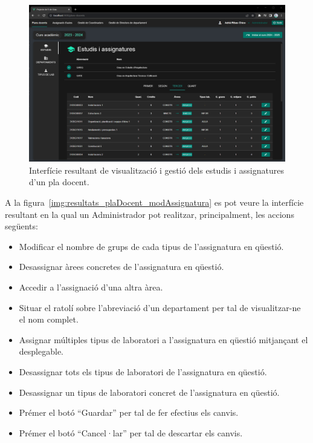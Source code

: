 \documentclass[a4paper,12pt]{ThesisStyle}
\begin{document}
\begin{figure}[H]
  \centering
  \includegraphics[width=\textwidth]{assets/results/plaDocent/estudis.png}
  \caption{\label{img:resultats_plaDocent_estudis} Interfície resultant de visualització i gestió dels estudis i assignatures d'un pla docent.}
\end{figure}

\newpage

A la figura~\ref{img:resultats_plaDocent_modAssignatura} es pot veure la interfície resultant en la qual un Administrador pot realitzar, principalment, les accions següents:
\begin{itemize}
  \item Modificar el nombre de grups de cada tipus de l'assignatura en qüestió.
  \item Desassignar àrees concretes de l'assignatura en qüestió.
  \item Accedir a l'assignació d'una altra àrea.
  \item Situar el ratolí sobre l'abreviació d'un departament per tal de visualitzar-ne el nom complet.
  \item Assignar múltiples tipus de laboratori a l'assignatura en qüestió mitjançant el desplegable.
  \item Desassignar tots els tipus de laboratori de l'assignatura en qüestió.
  \item Desassignar un tipus de laboratori concret de l'assignatura en qüestió.
  \item Prémer el botó ``Guardar'' per tal de fer efectius els canvis.
  \item Prémer el botó ``Cancel·lar'' per tal de descartar els canvis.
\end{itemize}
\end{document}
